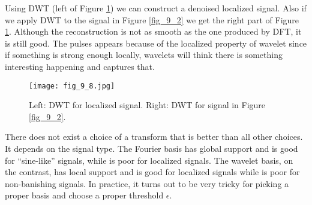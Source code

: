 \documentclass[../book-template.tex]{subfiles}
\begin{document}
Using DWT (left of Figure \ref{fig_9_8}) we can construct a denoised localized signal. Also if we apply DWT to the signal in Figure \ref{fig_9_2} we get the right part of Figure \ref{fig_9_8}. Although the reconstruction is not as smooth as the one produced by DFT, it is still good. The pulses appears because of the localized property of wavelet since if something is strong enough locally, wavelets will think there is something interesting happening and captures that. 
\begin{figure}[h] 
	\centering 
	\texttt{[image: fig\_9\_8.jpg]} 
	\caption{Left: DWT for localized signal. Right: DWT for signal in Figure \ref{fig_9_2}.}\label{fig_9_8}
\end{figure}
\par There does not exist a choice of a transform that is better than all other choices. It depends on the signal type. The Fourier basis has global support and is good for ``sine-like'' signals, while is poor for localized signals. The wavelet basis, on the contrast, has local support and is good for localized signals while is poor for non-banishing signals. In practice, it turns out to be very tricky for picking a proper basis and choose a proper threshold $\epsilon$. 
\end{document}
